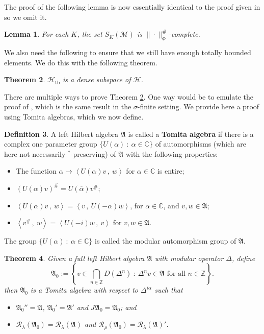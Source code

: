 \documentclass[12pt]{amsart}
\newtheorem{thm}{Theorem}[section]
\newtheorem{lem}[thm]{Lemma}
\theoremstyle{definition}
\newtheorem{defn}[thm]{Definition}
\def\cal{\mathcal}
\newcommand\ip[2]{\left\langle #1\, ,\!\ #2 \right\rangle}
\newcommand\R{{\cal R}}
\def \tb{\operatorname{tb}}
\def \bbC{\mathbb{C}}
\def \bbZ{\mathbb{Z}}
\begin{document}
The proof of the following lemma is now essentially identical to the proof given in \cite[Lemma 2.7]{AGHS} so we omit it.

\begin{lem}\label{LemSortsComplete}
    For each $K$, the set $S_{K}(\cal M)$ is $\|\cdot\|_{\Phi}^\#$-complete.
\end{lem}

We also need the following to ensure that we still have enough totally bounded elements.  We do this with the following theorem.

\begin{thm} \label{tbDense}
    $\cal H_{\tb}$ is a dense subspace of $\cal H$.
\end{thm}

There are multiple ways to prove Theorem \ref{tbDense}.  One way would be to emulate the proof of \cite[Proposition 2.3]{AGHS}, which is the same result in the $\sigma$-finite setting.  We provide here a proof using Tomita algebras, which we now define.

\begin{defn}{\cite[Chapter VI, Definition 2.1]{Takesaki}}
     A left Hilbert algebra $\mathfrak{A}$ is called a \textbf{Tomita algebra} if there is a complex one parameter group $\{U(\alpha) \ : \ \alpha \in \bbC\}$ of automorphisms (which are here not necessarily $^*$-preserving) of $\mathfrak{A}$ with the following properties:
     \begin{itemize}
         \item The function $\alpha \mapsto \ip{U(\alpha)v}{w}$ for $\alpha \in \bbC$ is entire;
         \item $(U(\alpha)v)^\# = U(\overline{\alpha})v^\#$;
         \item $ \ip{U(\alpha)v}{w} = \ip{v}{U(-\alpha)w}$, for $\alpha \in \bbC$, and $v, w \in \mathfrak{A}$;
         \item $ \ip{v^\#}{w} = \ip{U(-i)w}{v}$ for $v, w \in \mathfrak{A}$.
     \end{itemize}
     The group $\{ U(\alpha) \ : \ \alpha \in \bbC \}$ is called the modular automorphism group of $\mathfrak{A}$.
\end{defn}

\begin{thm}{\cite[Chapter VI, Theorem 2.2]{Takesaki}}\label{TomitaDense}
    Given a full left Hilbert algebra $\mathfrak{A}$ with modular operator $\Delta$, define
    \[
    \mathfrak{A}_0 := \left\{ v \in \bigcap_{n \in \bbZ} D(\Delta^n) \ : \  \Delta^n v \in \mathfrak{A} \text{ for all } n \in \bbZ \right\}.
    \]
    then $\mathfrak{A}_0$ is a Tomita algebra with respect to $\Delta^{i\alpha}$ such that
    \begin{itemize}
        \item $\mathfrak{A}_0'' = \mathfrak{A}$, $\mathfrak{A}_0' = \mathfrak{A}'$ and $J\mathfrak{A}_0 = \mathfrak{A}_0$; and
        \item $\R_{\lambda}(\mathfrak{A}_0) = \R_{\lambda}(\mathfrak{A})$ and $\R_{\rho}(\mathfrak{A}_0) = \R_{\lambda}(\mathfrak{A})'$.
    \end{itemize}
\end{thm}
\end{document}

